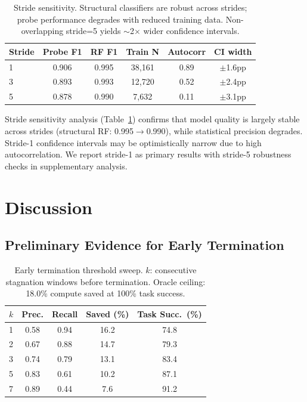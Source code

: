 \documentclass[11pt,a4paper]{article}
\begin{document}
\begin{table}[t]
\centering
\small
\begin{tabular}{lccccc}
\toprule
\textbf{Stride} & \textbf{Probe F1} & \textbf{RF F1} & \textbf{Train N} & \textbf{Autocorr} & \textbf{CI width} \\
\midrule
1 & 0.906 & 0.995 & 38{,}161 & 0.89 & $\pm$1.6pp \\
3 & 0.893 & 0.993 & 12{,}720 & 0.52 & $\pm$2.4pp \\
5 & 0.878 & 0.990 & 7{,}632 & 0.11 & $\pm$3.1pp \\
\bottomrule
\end{tabular}
\caption{Stride sensitivity. Structural classifiers are robust across strides; probe performance degrades with reduced training data. Non-overlapping stride=5 yields $\sim$2$\times$ wider confidence intervals.}
\label{tab:stride}
\end{table}

Stride sensitivity analysis (Table~\ref{tab:stride}) confirms that model quality is largely stable across strides (structural RF: 0.995$\to$0.990), while statistical precision degrades.
Stride-1 confidence intervals may be optimistically narrow due to high autocorrelation.
We report stride-1 as primary results with stride-5 robustness checks in supplementary analysis.

\section{Discussion}

\subsection{Preliminary Evidence for Early Termination}

\begin{table}[t]
\centering
\small
\begin{tabular}{lcccc}
\toprule
\textbf{$k$} & \textbf{Prec.} & \textbf{Recall} & \textbf{Saved (\%)} & \textbf{Task Succ.\ (\%)} \\
\midrule
1 & 0.58 & 0.94 & 16.2 & 74.8 \\
2 & 0.67 & 0.88 & 14.7 & 79.3 \\
3 & 0.74 & 0.79 & 13.1 & 83.4 \\
5 & 0.83 & 0.61 & 10.2 & 87.1 \\
7 & 0.89 & 0.44 & 7.6 & 91.2 \\
\bottomrule
\end{tabular}
\caption{Early termination threshold sweep. $k$: consecutive stagnation windows before termination. Oracle ceiling: 18.0\% compute saved at 100\% task success.}
\label{tab:early-term}
\end{table}
\end{document}

